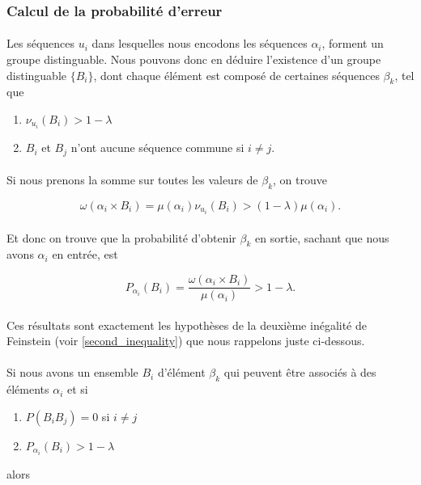 \subsubsection*{Calcul de la probabilité d'erreur}
	
	\paragraph{}
	Les séquences $u_i$ dans lesquelles nous encodons les séquences $\alpha_i$,
	forment un groupe distinguable. Nous pouvons donc en déduire l'existence
	d'un groupe distinguable $\{B_i\}$, dont chaque élément est composé de 
	certaines séquences $\beta_k$, tel que 
	\begin{enumerate}
		\item $\nu_{u_i}(B_i) > 1-\lambda$
		\item $B_i$ et $B_j$ n'ont aucune séquence commune si $i\neq j$.
	\end{enumerate}
	
	\paragraph{}Si nous prenons la somme sur toutes les valeurs de $\beta_k$,
	on trouve
	
	\[
		\omega(\alpha_i \times B_i)=
		\mu(\alpha_i)\nu_{u_i}(B_i)>(1-\lambda)\mu(\alpha_i).
	\]
	
	\paragraph{}
	Et donc on trouve que la probabilité d'obtenir $\beta_k$ en sortie,
	sachant que nous avons $\alpha_i$ en entrée, est
	
	\[
		P_{\alpha_i}(B_i)=
		\frac{\omega(\alpha_i \times B_i)}{\mu(\alpha_i)}>1-\lambda.
	\]
	
	\paragraph{}
	Ces résultats sont exactement les hypothèses de la deuxième inégalité 
	de Feinstein (voir \ref{second_inequality}) 
	que nous rappelons juste ci-dessous.
	
	\paragraph{}
	Si nous avons un ensemble $B_i$ d'élément $\beta_k$ qui peuvent être
	associés à des éléments $\alpha_i$ et si 
	\begin{enumerate}
		\item $P(B_iB_j)=0$ si $i\neq j$
		\item $P_{\alpha_i}(B_i)>1-\lambda$
	\end{enumerate}
	alors 
	
